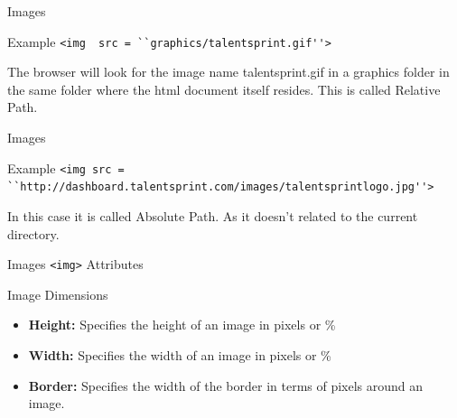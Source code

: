 \documentclass[14pt]{beamer}
\begin{document}
\begin{frame}{Images}
 \begin{block}{Example}
  \lstinline!<img  src = ``graphics/talentsprint.gif''>!
 \end{block}
The browser will look for the image name talentsprint.gif in a graphics folder in the same folder where the html document  itself resides.  This is called Relative Path.
\end{frame}

\begin{frame}{Images}
 \begin{block}{Example}
  \lstinline!<img src = ``http://dashboard.talentsprint.com/images/talentsprintlogo.jpg''> !
 \end{block}
In this case it is called Absolute Path. As it doesn't related to the current directory.
\end{frame}

\begin{frame}{Images}
 \lstinline!<img>! Attributes 
 
 \vspace{1pc}
 Image Dimensions
 \begin{itemize}
  \item \textbf{ Height:} Specifies the height of an image in pixels or \%
  \item \textbf{Width:} Specifies the width of an image in pixels or \%
  \item \textbf{Border:}  Specifies the width of the border in terms of pixels around an image.
 \end{itemize}
\end{frame}
\end{document}
